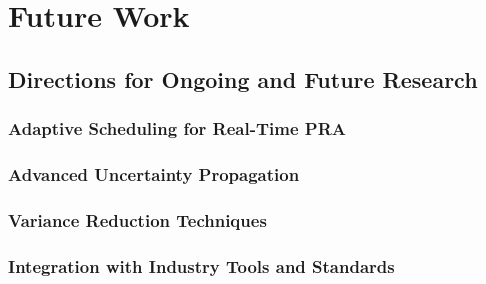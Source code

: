 \part{Future Work}
\chapter{Directions for Ongoing and Future Research}
\section{Adaptive Scheduling for Real-Time PRA}
\section{Advanced Uncertainty Propagation}
\section{Variance Reduction Techniques}
\section{Integration with Industry Tools and Standards}


